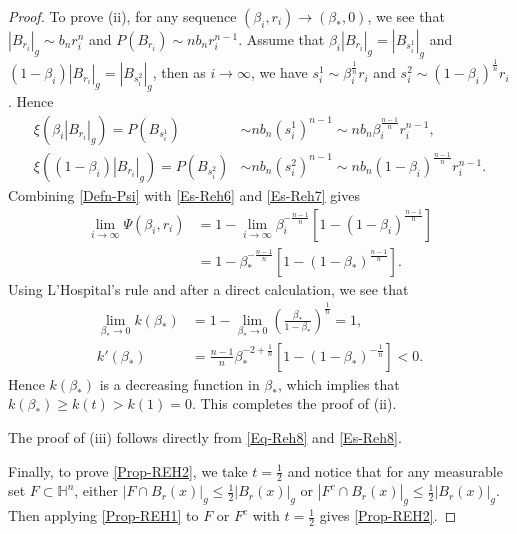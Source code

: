 \documentclass[11pt,reqno]{amsart}
\theoremstyle{definition}
\theoremstyle{remark}
\numberwithin{equation}{section}
\renewcommand{\(}{\left(}
\renewcommand{\)}{\right)}
\renewcommand{\-}{\overline}
\begin{document}
\begin{proof}
To prove (ii), for any sequence $(\beta_i,r_i)\to(\beta_{*},0)$, we see that $|B_{r_i}|_g\sim b_n r_i^n$ and $P(B_{r_i})\sim nb_nr_i^{n-1}$. Assume that $\beta_i|B_{r_i}|_g=|B_{s_i^1}|_g$ and $(1-\beta_i)|B_{r_i}|_g=|B_{s_i^2}|_g$, then as $i\to\infty$, we have $s_i^1\sim \beta_i^{\frac{1}{n}}r_i$ and $s_i^2\sim (1-\beta_i)^{\frac{1}{n}}r_i$. Hence 
\begin{align}
	\xi(\beta_i|B_{r_i}|_g)=P(B_{s_i^1})&\sim nb_n (s_i^1)^{n-1}\sim nb_n\beta_i^{\frac{n-1}{n}}r_i^{n-1},\label{Es-Reh6}\\
	\xi((1-\beta_i)|B_{r_i}|_g)=P(B_{s_i^2})&\sim nb_n (s_i^2)^{n-1}\sim nb_n(1-\beta_i)^{\frac{n-1}{n}}r_i^{n-1}.\label{Es-Reh7}
\end{align}
Combining \eqref{Defn-Psi} with \eqref{Es-Reh6} and \eqref{Es-Reh7} gives 
\begin{align}
	\lim_{i\to\infty}\Psi(\beta_i,r_i)&=1-\lim_{i\to\infty}\beta_{i}^{-\frac{n-1}{n}}[1-(1-\beta_{i})^{\frac{n-1}{n}}]\label{Eq-Reh8}\\
	&=1-\beta_{*}^{-\frac{n-1}{n}}[1-(1-\beta_{*})^{\frac{n-1}{n}}].\label{Eq-Reh9}
\end{align}
Using L'Hospital's rule and after a direct calculation, we see that 
\begin{align}
	\lim_{\beta_{*}\to 0}k(\beta_{*})&=1-\lim_{\beta_{*}\to 0}\left(\frac{\beta_{*}}{1-\beta_{*}}\right)^{\frac{1}{n}}=1,\label{Es-Reh8}\\
	k'(\beta_{*})&=\frac{n-1}{n}\beta_{*}^{-2+\frac{1}{n}}[1-(1-\beta_{*})^{-\frac{1}{n}}]<0.\label{Es-Reh9}
\end{align}
Hence $k(\beta_{*})$ is a decreasing function in $\beta_{*}$, which implies that $k(\beta_{*})\geq k(t)>k(1)=0$. This completes the proof of (ii).

The proof of (iii) follows directly from \eqref{Eq-Reh8} and \eqref{Es-Reh8}.

Finally, to prove \eqref{Prop-REH2}, we take $t=\frac{1}{2}$ and notice that for any measurable set $F\subset\mathbb{H}^n$, either $|F\cap B_r(x)|_g\leq\frac{1}{2}|B_r(x)|_g$ or $|F^c\cap B_r(x)|_g\leq\frac{1}{2}|B_r(x)|_g$. Then applying \eqref{Prop-REH1} to $F$ or $F^c$ with $t=\frac{1}{2}$ gives  \eqref{Prop-REH2}.
\end{proof}
\end{document}

